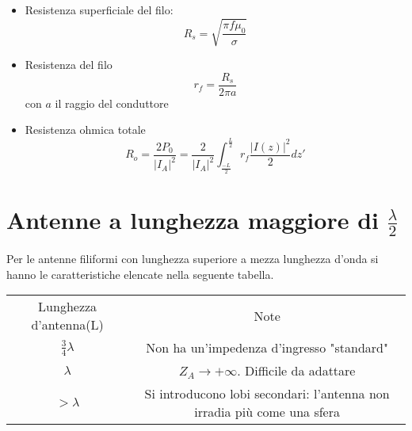 \begin{itemize}
\begin{esp}
        &=  =  
      \end{esp}
    \item Resistenza superficiale del filo:
        \begin{equation}
          R_s = \sqrt{\frac{\pi f \mu_0}{\sigma}}
        \end{equation}
    \item Resistenza del filo
      \begin{equation}
        r_f = \frac{R_s}{2\pi a}
      \end{equation}
      con $a$ il raggio del conduttore
    \item Resistenza ohmica totale
      \begin{equation}
        R_o = \frac{2 P_0}{\left |I_A \right |^{2}} = \frac{2}{\left |I_A \right |^{2}} \int_{\frac{-L}{2}}^{\frac{L}{2}} r_f \frac{\left |I(z) \right |^{2}}{2}dz'
      \end{equation}
\end{itemize}

\section{Antenne a lunghezza maggiore di $\frac{\lambda}{2}$}
Per le antenne filiformi con lunghezza superiore a mezza lunghezza d'onda si hanno le caratteristiche elencate nella seguente tabella.
\begin{table}[hb!]
\centering
\begin{tabular}{cc}
Lunghezza d'antenna(L) & Note\\
$\frac{3}{4}\lambda$      & Non ha un'impedenza d'ingresso "standard"\\
$\lambda$                 & $Z_A \to +\infty$. Difficile da adattare \\
$>\lambda$                & \parbox{7cm}{Si introducono lobi secondari: l'antenna non irradia più come una sfera}
\end{tabular}
\end{table}
